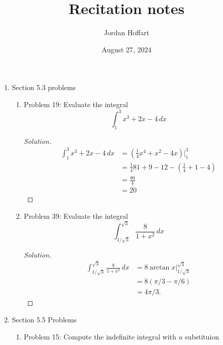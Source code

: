 \documentclass{article}
\title{Recitation notes}
\author{Jordan Hoffart}
\date{August 27, 2024}
\theoremstyle{plain}
\theoremstyle{definition}
\begin{document}
\maketitle
\begin{enumerate}
	\item Section 5.3 problems
	      \begin{enumerate}
		      \item Problem 19: Evaluate the integral
		            \begin{equation}
			            \int_1^3 x^3 + 2x - 4 \,dx
		            \end{equation}
		            \begin{proof}[Solution]
			            \begin{align}
				            \int_1^3 x^3 + 2x - 4 \,dx & = (\frac{1}{4}x^4 + x^2 - 4x)\bigg|_1^3          \\
				                                       & = \frac{1}{4}81 + 9 - 12 - (\frac{1}{4} + 1 - 4) \\
				                                       & = \frac{80}{4}                                   \\
				                                       & = 20
			            \end{align}
		            \end{proof}
		      \item Problem 39: Evaluate the integral
		            \begin{equation}
			            \int_{1/\sqrt{3}}^{\sqrt{3}} \frac{8}{1+x^2}\,dx
		            \end{equation}
		            \begin{proof}[Solution]
			            \begin{align}
				            \int_{1/\sqrt{3}}^{\sqrt{3}} \frac{8}{1+x^2}\,dx & = 8 \arctan x \bigg|_{1/\sqrt{3}}^{\sqrt{3}} \\
				                                                             & = 8 (\pi / 3 - \pi / 6)                      \\
				                                                             & = 4 \pi / 3.
			            \end{align}
		            \end{proof}
	      \end{enumerate}
	\item Section 5.5 Problems
	      \begin{enumerate}
		      \item Problem 15: Compute the indefinite integral with $u$ substituion

\end{enumerate}
\end{enumerate}
\end{document}
